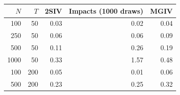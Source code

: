 \begin{tabular}{rrrrr}
\toprule
$N$ & $T$ & 2SIV & Impacts (1000 draws) & MGIV \\
\midrule
100 & 50 & 0.03 & 0.02 & 0.04 \\
250 & 50 & 0.06 & 0.06 & 0.09 \\
500 & 50 & 0.11 & 0.26 & 0.19 \\
1000 & 50 & 0.33 & 1.57 & 0.48 \\
100 & 200 & 0.05 & 0.01 & 0.06 \\
500 & 200 & 0.23 & 0.25 & 0.32 \\
\bottomrule
\end{tabular}
